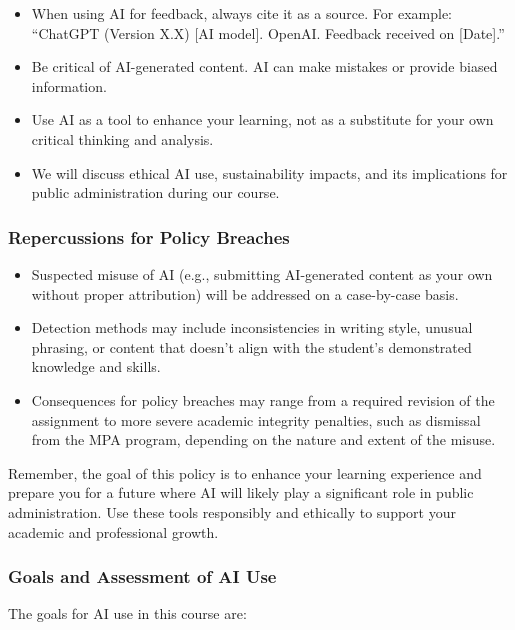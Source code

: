 \documentclass[12pt, letterpaper]{article}
\begin{document}
\begin{itemize}
    \item When using AI for feedback, always cite it as a source. For example: ``ChatGPT (Version X.X) [AI model]. OpenAI. Feedback received on [Date].''
    \item Be critical of AI-generated content. AI can make mistakes or provide biased information.
    \item Use AI as a tool to enhance your learning, not as a substitute for your own critical thinking and analysis.
    \item We will discuss ethical AI use, sustainability impacts, and its implications for public administration during our course.
\end{itemize}

\subsubsection*{Repercussions for Policy Breaches}

\begin{itemize}
    \item Suspected misuse of AI (e.g., submitting AI-generated content as your own without proper attribution) will be addressed on a case-by-case basis.
    \item Detection methods may include inconsistencies in writing style, unusual phrasing, or content that doesn't align with the student's demonstrated knowledge and skills.
    \item Consequences for policy breaches may range from a required revision of the assignment to more severe academic integrity penalties, such as dismissal from the MPA program, depending on the nature and extent of the misuse.
\end{itemize}

\noindent Remember, the goal of this policy is to enhance your learning experience and prepare you for a future where AI will likely play a significant role in public administration. Use these tools responsibly and ethically to support your academic and professional growth.

\subsubsection*{Goals and Assessment of AI Use}

\noindent The goals for AI use in this course are:
\end{document}
